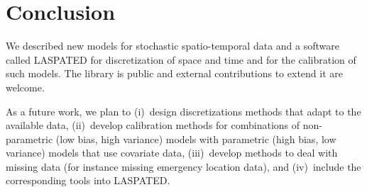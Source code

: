 \documentclass[article]{jss}
\begin{document}
\section{Conclusion}

We described new models for stochastic spatio-temporal data and a software called LASPATED for discretization of space and time and for the calibration of such models.
The library is public and external contributions to extend it are welcome.

As a future work, we plan to (i)~design discretizations methods that adapt to the available data, (ii)~develop calibration methods for combinations of non-parametric (low bias, high variance) models with parametric (high bias, low variance) models that use covariate data, (iii)~develop methods to deal with missing data (for instance missing emergency location data), and (iv)~include the corresponding tools into LASPATED.


\end{document}
